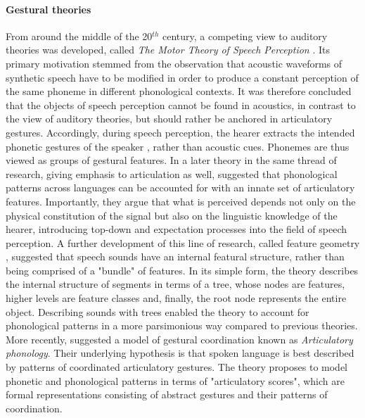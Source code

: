 \paragraph{Gestural theories}
From around the middle of the 20$^{th}$ century, a competing view to auditory theories was developed, called {\it The Motor Theory of Speech Perception} \citep{cooper1952some, liberman1967perception}. Its primary motivation stemmed from the observation that acoustic waveforms of synthetic speech have to be modified in order to produce a constant perception of the same phoneme in different phonological contexts. It was therefore concluded that the objects of speech perception cannot be found in acoustics, in contrast to the view of auditory theories, but should rather be anchored in articulatory gestures. Accordingly, during speech perception, the hearer extracts the intended phonetic gestures of the speaker \citep{liberman1985motor}, rather than acoustic cues. Phonemes are thus viewed as groups of gestural features. In a later theory in the same thread of research, giving emphasis to articulation as well, \citet{ChomskyHalle1968} suggested that phonological patterns across languages can be accounted for with an innate set of articulatory features. Importantly, they argue that what is perceived depends not only on the physical constitution of the signal but also on the linguistic knowledge of the hearer, introducing top-down and expectation processes into the field of speech perception. A further development of this line of research, called feature geometry \citep{clements1985, sagey1986representation}, suggested that speech sounds have an internal featural structure, rather than being comprised of a "bundle" of features. In its simple form, the theory describes the internal structure of segments in terms of a tree, whose nodes are features, higher levels are feature classes and, finally, the root node represents the entire object. Describing sounds with trees enabled the theory to account for phonological patterns in a more parsimonious way compared to previous theories. More recently, \citet{browman1990tiers, browman1992articulatory} suggested a model of gestural coordination known as \textit{Articulatory phonology}. Their underlying hypothesis is that spoken language is best described by patterns of coordinated articulatory gestures. The theory proposes to model phonetic and phonological patterns in terms of "articulatory scores", which are formal representations consisting of abstract gestures and their patterns of coordination.


